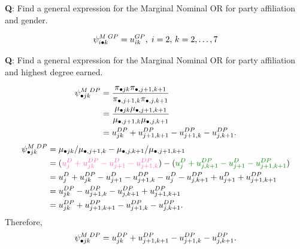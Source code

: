\documentclass[oneside]{book}\usepackage[]{graphicx}\usepackage[svgnames]{xcolor}
\let\exp\relax%
\let\log\relax%
\begin{document}
\begin{Example}{}
    \textbf{Q}: Find a general expression for the Marginal Nominal OR for party affiliation and
    gender.
\end{Example}
\[ \psi_{i\bullet k}^{M\; GP}=\exp{u_{ik}^{GP}},\; i=2,\, k=2,\ldots,7 \]
\begin{Example}{}
    \textbf{Q}: Find a general expression for the Marginal Nominal OR for party affiliation and
    highest degree earned.
\end{Example}
\begin{align*}
    \psi_{\bullet jk}^{M\; DP}
     & =\frac{\pi_{\bullet jk}\pi_{\bullet,j+1,k+1}}{\pi_{\bullet,j+1,k}\pi_{\bullet,j,k+1}} \\
     & =\frac{\mu_{\bullet jk}\mu_{\bullet,j+1,k+1}}{\mu_{\bullet,j+1,k}\mu_{\bullet,j,k+1}} \\
     & =\exp{u_{jk}^{DP}+u_{j+1,k+1}^{DP}-u_{j+1,k}^{DP}-u_{j,k+1}^{DP} }.
\end{align*}
\begin{align*}
    \log{\psi_{\bullet jk}^{M\; DP}}
     & =\log{\mu_{\bullet jk}/\mu_{\bullet,j+1,k}}-\log{\mu_{\bullet,j,k+1}/\mu_{\bullet,j+1,k+1}}                                                 \\
     & =(\textcolor{HotPink}{u_j^D+u_{jk}^{DP}-u_{j+1}^{D}-u_{j+1,k}^{DP}})-(\textcolor{Green}{u_j^D+u_{j,k+1}^{DP}-u_{j+1}^{D}-u_{j+1,k+1}^{DP}}) \\
     & =u_j^D+u_{jk}^{DP}-u_{j+1}^{D}-u_{j+1,k}^{DP}-u_j^D-u_{j,k+1}^{DP}+u_{j+1}^{D}+u_{j+1,k+1}^{DP}                                             \\
     & =u_{jk}^{DP}-u_{j+1,k}^{DP}-u_{j,k+1}^{DP}+u_{j+1,k+1}^{DP}                                                                                 \\
     & =u_{jk}^{DP}+u_{j+1,k+1}^{DP}-u_{j+1,k}^{DP}-u_{j,k+1}^{DP}.
\end{align*}
Therefore,
\[ \psi_{\bullet jk}^{M\; DP}=\exp{u_{jk}^{DP}+u_{j+1,k+1}^{DP}-u_{j+1,k}^{DP}-u_{j,k+1}^{DP}}. \]
\end{document}
